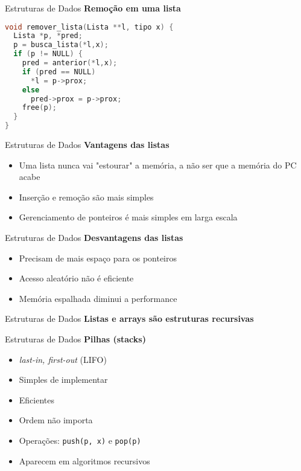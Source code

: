 \documentclass[10pt]{beamer}
\begin{document}
\begin{frame}[fragile]{Estruturas de Dados}
  \huge
  \textbf{Remoção em uma lista}
  \vfill
  \large
  \begin{lstlisting}[language=C]
void remover_lista(Lista **l, tipo x) {
  Lista *p, *pred;
  p = busca_lista(*l,x);
  if (p != NULL) {
    pred = anterior(*l,x);
    if (pred == NULL)
      *l = p->prox;
    else
      pred->prox = p->prox;
    free(p);
  }
}
  \end{lstlisting}
\end{frame}

\begin{frame}{Estruturas de Dados}
  \huge
  \textbf{Vantagens das listas}
  \vfill
  \large
  \begin{itemize}
    \item Uma lista nunca vai "estourar" a memória, a não ser que a memória do PC acabe
    \item Inserção e remoção são mais simples
    \item Gerenciamento de ponteiros é mais simples em larga escala
  \end{itemize}
\end{frame}

\begin{frame}{Estruturas de Dados}
  \huge
  \textbf{Desvantagens das listas}
  \vfill
  \large
  \begin{itemize}
    \item Precisam de mais espaço para os ponteiros
    \item Acesso aleatório não é eficiente
    \item Memória espalhada diminui a performance
  \end{itemize}
\end{frame}


\begin{frame}{Estruturas de Dados}
  \huge
  \textbf{Listas e arrays são estruturas \alert{recursivas}}
\end{frame}

\begin{frame}{Estruturas de Dados}
  \huge
  \textbf{Pilhas (stacks)}
  \vfill
  \Large
  \begin{itemize}
    \item \textit{last-in, first-out} (LIFO)
    \item Simples de implementar
    \item Eficientes
    \item Ordem não importa
    \item Operações: \texttt{push(p, x)} e \texttt{pop(p)}
    \item Aparecem em algoritmos recursivos
  \end{itemize}
\end{frame}
\end{document}
